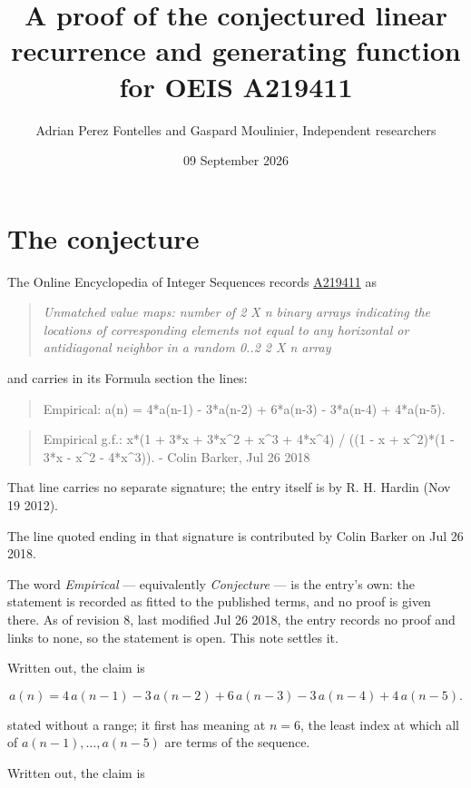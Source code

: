 \documentclass[11pt]{article}
\title{A proof of the conjectured linear recurrence and generating function for OEIS A219411}
\author{Adrian Perez Fontelles and Gaspard Moulinier, Independent researchers}
\date{09 September 2026}
\theoremstyle{definition}
\begin{document}
\maketitle
\section{The conjecture}

The Online Encyclopedia of Integer Sequences records \href{https://oeis.org/A219411}{A219411} as

\begin{quote}\itshape Unmatched value maps: number of 2 X n binary arrays indicating the locations of corresponding elements not equal to any horizontal or antidiagonal neighbor in a random 0..2 2 X n array\end{quote}

and carries in its Formula section the lines:

\begin{quote}\ttfamily Empirical: a(n) = 4*a(n-1) - 3*a(n-2) + 6*a(n-3) - 3*a(n-4) + 4*a(n-5).\end{quote}

\begin{quote}\ttfamily Empirical g.f.: x*(1 + 3*x + 3*x\textasciicircum{}2 + x\textasciicircum{}3 + 4*x\textasciicircum{}4) / ((1 - x + x\textasciicircum{}2)*(1 - 3*x - x\textasciicircum{}2 - 4*x\textasciicircum{}3)). - Colin Barker, Jul 26 2018\end{quote}

That line carries no separate signature; the entry itself is by R. H. Hardin (Nov 19 2012).

The line quoted ending in that signature is contributed by Colin Barker on Jul 26 2018.

The word {\itshape Empirical} --- equivalently {\itshape Conjecture} --- is the entry's own: the statement is recorded as fitted to the published terms, and no proof is given there. As of revision 8, last modified Jul 26 2018, the entry records no proof and links to none, so the statement is open. This note settles it.

Written out, the claim is

\[a(n) = 4\,a(n-1) - 3\,a(n-2) + 6\,a(n-3) - 3\,a(n-4) + 4\,a(n-5).\]

stated without a range; it first has meaning at $n = 6$, the least index at which all of $a(n-1),\dots,a(n-5)$ are terms of the sequence.

Written out, the claim is
\end{document}
